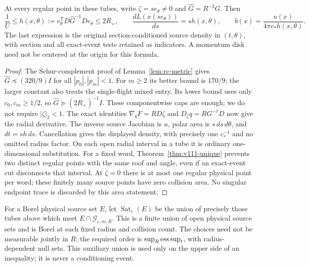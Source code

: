 \begin{lemma}
\label{lem:at-roof-jacobian}
At every regular point in these tubes, write
$\zeta=s e_\theta\ne0$ and
$\widehat G=R^{-2}G$.  Then
\begin{equation}\label{eq:at-roof-jacobian}
 \frac1U\le h(x,\theta):=
 e_\theta^{\mathsf T}D\widehat G^{-1}De_\theta
 \le 2R_+,\qquad
 \frac{dL(x(se_\theta))}{ds}=s h(x,\theta),\qquad
 b(x)=\frac{u(x)}{4\pi c_*h(x,\theta)}.
\end{equation}
The last expression is the original section-conditioned source
density in $(t,\theta)$, with section and all exact-event tests
retained as indicators.  A momentum disk need not be centered at
the origin for this formula.
\end{lemma}
\begin{proof}
The Schur-complement proof of Lemma~\ref{lem:rc-metric} gives
$\widehat G\preceq(320/9)I$ for all $|p_0|,|p_m|<1$.
For $m\ge2$ its better bound is $170/9$; the larger constant
also treats the single-flight mixed entry.  Its lower bound uses
only $c_0,c_m\ge1/2$, so
$\widehat G\succeq(2R_+)^{-1}I$.  These componentwise caps
are enough; we do not require $|\zeta|_2<1$.
The exact identities
$\nabla_qF=RD\zeta$ and $D_\zeta q=RG^{-1}D$ now give the
radial derivative.  The inverse source Jacobian is $u$, polar
area is $s\,ds\,d\theta$, and $dt=s h\,ds$.  Cancellation
gives the displayed density, with precisely one $c_*^{-1}$ and
no omitted radius factor.  On each open radial interval in a
tube it is ordinary one-dimensional substitution.  For a fixed
word, Theorem~\ref{thm:v111-unique} prevents two distinct regular
points with the same roof and angle, even if an exact-event cut
disconnects that interval.  At $\zeta=0$ there is at most one
regular physical point per word; these finitely many source
points have zero collision area.  No singular endpoint trace is
discarded by this area statement.
\end{proof}

For a Borel physical source set $E$, let
$\operatorname{Sat}_\varepsilon(E)$ be the union of precisely
those tubes above which meet $E\cap\mathcal G_{\varepsilon,m,R}$.
This is a finite union of open physical source sets and is Borel
at each fixed radius and collision count.  The choices need not
be measurable jointly in $R$: the required order is
$\sup_R\operatorname*{ess\,sup}_t$, with radius-dependent null sets.  This
auxiliary union is used only on the upper side of an inequality;
it is never a conditioning event.

